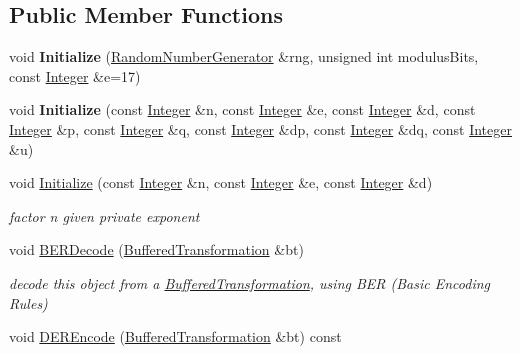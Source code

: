 \subsection*{Public Member Functions}
\begin{DoxyCompactItemize}
\item 
\hypertarget{class_invertible_r_s_a_function_a1d400269a0d1305e93623299d8184e29}{
void {\bfseries Initialize} (\hyperlink{class_random_number_generator}{RandomNumberGenerator} \&rng, unsigned int modulusBits, const \hyperlink{class_integer}{Integer} \&e=17)}
\label{class_invertible_r_s_a_function_a1d400269a0d1305e93623299d8184e29}

\item 
\hypertarget{class_invertible_r_s_a_function_a6ff0e6c1bb44bff9fd7d3745b9f8de92}{
void {\bfseries Initialize} (const \hyperlink{class_integer}{Integer} \&n, const \hyperlink{class_integer}{Integer} \&e, const \hyperlink{class_integer}{Integer} \&d, const \hyperlink{class_integer}{Integer} \&p, const \hyperlink{class_integer}{Integer} \&q, const \hyperlink{class_integer}{Integer} \&dp, const \hyperlink{class_integer}{Integer} \&dq, const \hyperlink{class_integer}{Integer} \&u)}
\label{class_invertible_r_s_a_function_a6ff0e6c1bb44bff9fd7d3745b9f8de92}

\item 
\hypertarget{class_invertible_r_s_a_function_a82875d7b47505dc036005186c45dbde7}{
void \hyperlink{class_invertible_r_s_a_function_a82875d7b47505dc036005186c45dbde7}{Initialize} (const \hyperlink{class_integer}{Integer} \&n, const \hyperlink{class_integer}{Integer} \&e, const \hyperlink{class_integer}{Integer} \&d)}
\label{class_invertible_r_s_a_function_a82875d7b47505dc036005186c45dbde7}

\begin{DoxyCompactList}\small\item\em factor n given private exponent \item\end{DoxyCompactList}\item 
\hypertarget{class_invertible_r_s_a_function_a315fea96cb04dc41150d92cf5d1ce3e0}{
void \hyperlink{class_invertible_r_s_a_function_a315fea96cb04dc41150d92cf5d1ce3e0}{BERDecode} (\hyperlink{class_buffered_transformation}{BufferedTransformation} \&bt)}
\label{class_invertible_r_s_a_function_a315fea96cb04dc41150d92cf5d1ce3e0}

\begin{DoxyCompactList}\small\item\em decode this object from a \hyperlink{class_buffered_transformation}{BufferedTransformation}, using BER (Basic Encoding Rules) \item\end{DoxyCompactList}\item 
\hypertarget{class_invertible_r_s_a_function_af8c59c737c96b4809734971d0703707d}{
void \hyperlink{class_invertible_r_s_a_function_af8c59c737c96b4809734971d0703707d}{DEREncode} (\hyperlink{class_buffered_transformation}{BufferedTransformation} \&bt) const }
\label{class_invertible_r_s_a_function_af8c59c737c96b4809734971d0703707d}


\end{DoxyCompactItemize}
